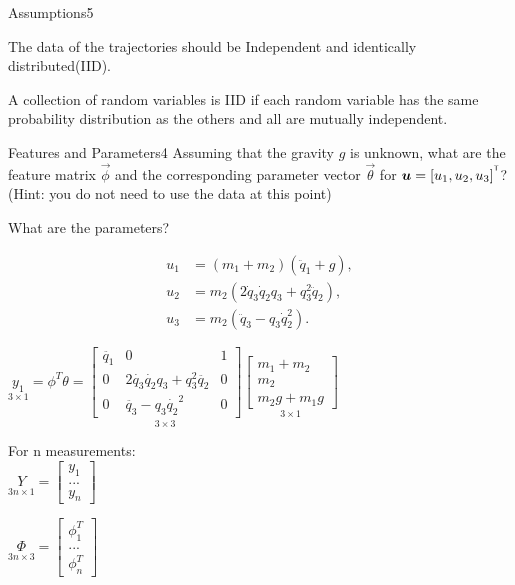 \begin{questions}
\begin{question}{Assumptions}{5}
\begin{answer}
	The data of the trajectories should be Independent and identically distributed(IID). 

	A collection of random variables is IID if each random variable has the same probability distribution as the others and all are mutually independent.

	\end{answer}

\end{question}



\begin{question}{Features and Parameters}{4}
Assuming that the gravity $g$ is unknown, what are the feature matrix $\vec{\phi}$ and the corresponding parameter vector $\vec{\theta}$ for ${\boldsymbol{u}}=[u_{1},u_{2},u_{3}]^{^\mathsf{T}}$?
(Hint: you do not need to use the data at this point)

\begin{answer}
	
	What are the parameters?
		
		\begin{align*}
		u_{1} &= (m_{1}+m_{2})(\ddot{q}_{1}+g),\\
		u_{2} &= m_{2}(2\dot{q}_{3}\dot{q}_{2}q_{3}+q_{3}^{2}\ddot{q}_{2}),\\
		u_{3} &= m_{2}(\ddot{q}_{3}-q_{3}\dot{q}_{2}^{2}).
		\end{align*}
		
	$\underset{3\times 1}{y_1}= \phi^T \theta=  \underset{3\times 3} {\begin{bmatrix}
	\ddot{q_1}&0&1\\0&2\dot{q_3}\dot{q_2}q_3+q_3^2\ddot{q_2}&0\\0&\ddot{q_3}-q_3 \dot{q_2}^2&0
	\end{bmatrix}}
	\underset{3\times 1}{\begin{bmatrix}
	m_1+m_2\\m_2\\ m_2g+m_1g
	\end{bmatrix}}$
	
	For n measurements: \\
	$\underset{3n \times 1}Y=\begin{bmatrix}
	y_1\\...\\y_n
	\end{bmatrix}$
	
	$\underset{3n \times 3}\Phi=\begin{bmatrix}
	\phi_1^T\\...\\ \phi_n^T
	\end{bmatrix}$
	

\end{answer}
\end{question}
\end{questions}
